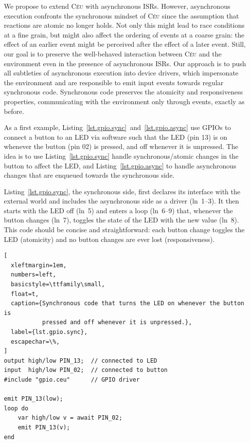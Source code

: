 \documentclass[sigplan,10pt,review,anonymous]{acmart}\settopmatter{printfolios=true,printccs=false,printacmref=false}
\newcommand{\CEU}{\textsc{C\'{e}u}\xspace}
\begin{document}
We propose to extend \CEU with asynchronous ISRs.
However, asynchronous execution confronts the synchronous mindset of \CEU since
the assumption that reactions are atomic no longer holds.
Not only this might lead to race conditions at a fine grain, but might also
affect the ordering of events at a coarse grain: the effect of an earlier event
might be perceived after the effect of a later event.
%
Still, our goal is to preserve the well-behaved interaction between \CEU and
the environment even in the presence of asynchronous ISRs.
%
Our approach is to push all subtleties of asynchronous execution into device
drivers, which impersonate the environment and are responsible to emit input
events towards regular synchronous code.
%
Synchronous code preserves the atomicity and responsiveness properties,
communicating with the environment only through events, exactly as before.

As a first example, Listing~\ref{lst.gpio.sync}~and~\ref{lst.gpio.async} use
GPIOs to connect a button to an LED via software such that the LED (pin 13) is
on whenever the button (pin 02) is pressed, and off whenever it is unpressed.
%
The idea is to use Listing~\ref{lst.gpio.sync} handle synchronous/atomic
changes in the button to affect the LED, and Listing~\ref{lst.gpio.async} to
handle asynchronous changes that are enqueued towards the synchronous side.

Listing~\ref{lst.gpio.sync}, the synchronous side, first declares its interface
with the external world and includes the asynchronous side as a driver
(ln~1--3).
It then starts with the LED off (ln~5) and enters a loop (ln~6--9) that,
whenever the button changes (ln~7), toggles the state of the LED with the new
value (ln~8).
%
This code should be concise and straightforward: each button change toggles the
LED (atomicity) and no button changes are ever lost (responsiveness).

\begin{lstlisting}[
  xleftmargin=1em,
  numbers=left,
  basicstyle=\ttfamily\small,
  float=t,
  caption={Synchronous code that turns the LED on whenever the button is
           pressed and off whenever it is unpressed.},
  label={lst.gpio.sync},
  escapechar=\%,
]
output high/low PIN_13;  // connected to LED
input  high/low PIN_02;  // connected to button
#include "gpio.ceu"      // GPIO driver

emit PIN_13(low);
loop do
    var high/low v = await PIN_02;
    emit PIN_13(v);
end
\end{lstlisting}
\end{document}
